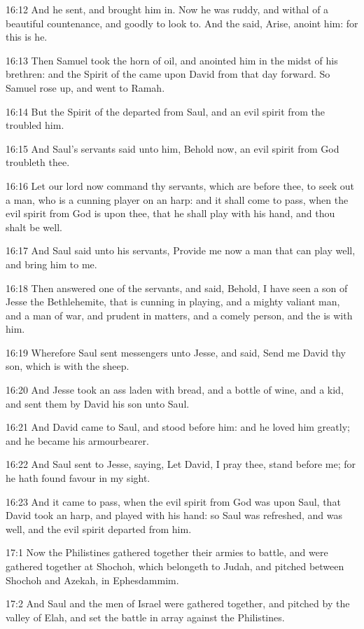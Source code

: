 16:12 And he sent, and brought him in. Now he was ruddy, and withal of a beautiful countenance, and goodly to look to. And the \LORD said, Arise, anoint him: for this is he.

16:13 Then Samuel took the horn of oil, and anointed him in the midst of his brethren: and the Spirit of the \LORD came upon David from that day forward. So Samuel rose up, and went to Ramah.

16:14 But the Spirit of the \LORD departed from Saul, and an evil spirit from the \LORD troubled him.

16:15 And Saul's servants said unto him, Behold now, an evil spirit from God troubleth thee.

16:16 Let our lord now command thy servants, which are before thee, to seek out a man, who is a cunning player on an harp: and it shall come to pass, when the evil spirit from God is upon thee, that he shall play with his hand, and thou shalt be well.

16:17 And Saul said unto his servants, Provide me now a man that can play well, and bring him to me.

16:18 Then answered one of the servants, and said, Behold, I have seen a son of Jesse the Bethlehemite, that is cunning in playing, and a mighty valiant man, and a man of war, and prudent in matters, and a comely person, and the \LORD is with him.

16:19 Wherefore Saul sent messengers unto Jesse, and said, Send me David thy son, which is with the sheep.

16:20 And Jesse took an ass laden with bread, and a bottle of wine, and a kid, and sent them by David his son unto Saul.

16:21 And David came to Saul, and stood before him: and he loved him greatly; and he became his armourbearer.

16:22 And Saul sent to Jesse, saying, Let David, I pray thee, stand before me; for he hath found favour in my sight.

16:23 And it came to pass, when the evil spirit from God was upon Saul, that David took an harp, and played with his hand: so Saul was refreshed, and was well, and the evil spirit departed from him.

17:1 Now the Philistines gathered together their armies to battle, and were gathered together at Shochoh, which belongeth to Judah, and pitched between Shochoh and Azekah, in Ephesdammim.

17:2 And Saul and the men of Israel were gathered together, and pitched by the valley of Elah, and set the battle in array against the Philistines.

